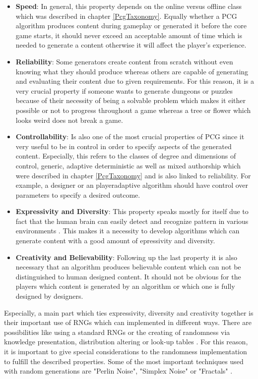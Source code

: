 \documentclass[MGS,Master,english]{twbook}%
\begin{document}
\begin{itemize}
	\item \textbf{Speed}: In general, this property depends on the online versus offline class which was described in chapter \ref{PcgTaxonomy}. Equally whether a PCG algorithm produces content during gameplay or generated it before the core game starts, it should never exceed an acceptable amount of time which is needed to generate a content otherwise it will affect the player's experience. \cite{pcg::book}
	\item \textbf{Reliability}: Some generators create content from scratch without even knowing what they should produce whereas others are capable of generating and evaluating their content due to given requirements. For this reason, it is a very crucial property if someone wants to generate dungeons or puzzles because of their necessity of being a solvable problem which makes it either possible or not to progress throughout a game whereas a tree or flower which looks weird does not break a game. \cite{pcg::book}
	\item \textbf{Controllability}: Is also one of the most crucial properties of PCG since it very useful to be in control in order to specify aspects of the generated content. Especially, this refers to the classes of degree and dimensions of control, generic, adaptive deterministic as well as mixed authorship which were described in chapter \ref{PcgTaxonomy} and is also linked to reliability. For example, a designer or an playeradaptive algorithm should have control over parameters to specify a desired outcome. \cite{pcg::book}
	\item \textbf{Expressivity and Diversity}: This property speaks mostly for itself due to fact that the human brain can easily detect and recognize pattern in various environments . This makes it a necessity to develop algorithms which can generate content with a good amount of epressivity and diversity. \cite{pcg::book}
	\item \textbf{Creativity and Believability}: Following up the last property it is also necessary that an algorithm produces believable content which can not be distinguished to human designed content. It should not be obvious for the players which content is generated by an algorithm or which one is fully designed by designers. \cite{pcg::book}
\end{itemize}
Especially, a main part which ties expressivity, diversity and creativity together is their important use of \ac{RNG}s which can implemented in different ways. There are possibilities like using a standard RNGs or the creating of randomness via knowledge presentation, distribution altering or look-up tables \cite{pcg::book}. For this reason, it is important to give special considerations to the randomness implementation to fulfill the described properties. Some of the most important techniques used with random generations are "Perlin Noise", "Simplex Noise" or "Fractals" \cite{pcg::shortHistoryOfDynamicAndPCG}.
\end{document}
